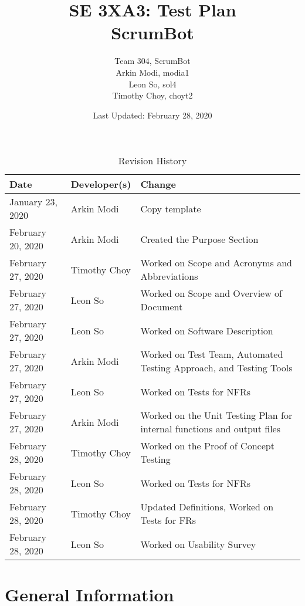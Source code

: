 \documentclass[12pt, titlepage]{article}
\title{SE 3XA3: Test Plan\\ScrumBot}
\author{
	Team 304, ScrumBot
		\\ Arkin Modi, modia1
        \\ Leon So, sol4
        \\ Timothy Choy, choyt2
}
\date{Last Updated: February 28, 2020}
\begin{document}
\newpage
\maketitle

\tableofcontents
\listoftables
\listoffigures

\newpage

\begin{table}[!hbp]
    \caption{Revision History} \label{TblRevisionHistory}
    \begin{tabularx}{\textwidth}{llX}
        \toprule
            \textbf{Date} & \textbf{Developer(s)} & \textbf{Change}\\
        \midrule
            January 23, 2020 & Arkin Modi & Copy template\\
            February 20, 2020 & Arkin Modi & Created the Purpose Section\\
            February 27, 2020 & Timothy Choy & Worked on Scope and Acronyms and Abbreviations\\
            February 27, 2020 & Leon So & Worked on Scope and Overview of Document\\
            February 27, 2020 & Leon So & Worked on Software Description\\
            February 27, 2020 & Arkin Modi & Worked on Test Team, Automated Testing Approach, and Testing Tools\\
            February 27, 2020 & Leon So & Worked on Tests for NFRs\\
            February 27, 2020 & Arkin Modi & Worked on the Unit Testing Plan for internal functions and output files\\
            February 28, 2020 & Timothy Choy & Worked on the Proof of Concept Testing\\
            February 28, 2020 & Leon So & Worked on Tests for NFRs\\
            February 28, 2020 & Timothy Choy & Updated Definitions, Worked on Tests for FRs\\
            February 28, 2020 & Leon So & Worked on Usability Survey\\
        \bottomrule
    \end{tabularx}
\end{table}


\newpage


\section{General Information}
\end{document}
